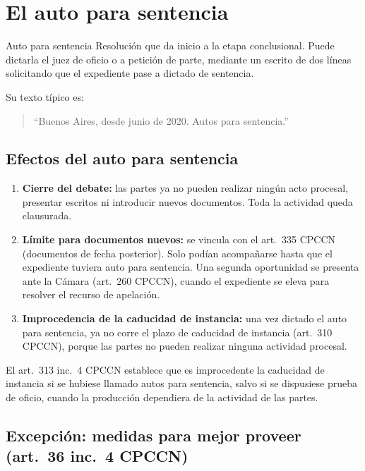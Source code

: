 \documentclass[12pt,oneside]{book}
\begin{document}
\section{El auto para sentencia}

\begin{definition}{Auto para sentencia}
Resolución que da inicio a la etapa conclusional. Puede dictarla el juez de oficio o a petición de parte, mediante un escrito de dos líneas solicitando que el expediente pase a dictado de sentencia.
\end{definition}

Su texto típico es:

\begin{quote}
``Buenos Aires, desde junio de 2020. Autos para sentencia.''
\end{quote}

\subsection{Efectos del auto para sentencia}

\begin{enumerate}
    \item \textbf{Cierre del debate:} las partes ya no pueden realizar ningún acto procesal, presentar escritos ni introducir nuevos documentos. Toda la actividad queda clausurada.
    \item \textbf{Límite para documentos nuevos:} se vincula con el art.~335 CPCCN (documentos de fecha posterior). Solo podían acompañarse hasta que el expediente tuviera auto para sentencia. Una segunda oportunidad se presenta ante la Cámara (art.~260 CPCCN), cuando el expediente se eleva para resolver el recurso de apelación.
    \item \textbf{Improcedencia de la caducidad de instancia:} una vez dictado el auto para sentencia, ya no corre el plazo de caducidad de instancia (art.~310 CPCCN), porque las partes no pueden realizar ninguna actividad procesal.
\end{enumerate}

El art.~313 inc.~4 CPCCN establece que es improcedente la caducidad de instancia si se hubiese llamado autos para sentencia, salvo si se dispusiese prueba de oficio, cuando la producción dependiera de la actividad de las partes.

\subsection{Excepción: medidas para mejor proveer (art.~36 inc.~4 CPCCN)}
\end{document}
